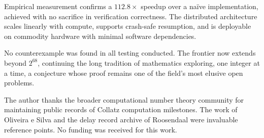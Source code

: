 \documentclass{mcom-l}
\theoremstyle{definition}
\theoremstyle{remark}
\numberwithin{equation}{section}
\begin{document}
Empirical measurement confirms a $112.8\times$ speedup over a na\"{i}ve
implementation, achieved with no sacrifice in verification correctness.
The distributed architecture scales linearly with compute, supports
crash-safe resumption, and is deployable on commodity hardware with
minimal software dependencies.

No counterexample was found in all testing conducted.  The frontier now
extends beyond $2^{68}$, continuing the long tradition of mathematics
exploring, one integer at a time, a conjecture whose proof remains one
of the field's most elusive open problems.

\begin{ack}
The author thanks the broader computational number theory community for
maintaining public records of Collatz computation milestones.  The work
of Oliveira e Silva \cite{OliveiraeSilva2010} and the delay record
archive of Roosendaal \cite{Roosendaal} were invaluable reference
points.  No funding was received for this work.
\end{ack}


\end{document}
